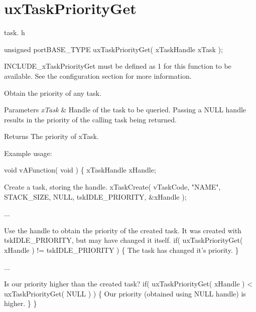 \hypertarget{group__ux_task_priority_get}{\section{ux\-Task\-Priority\-Get}
\label{group__ux_task_priority_get}
}
task. h 
\begin{DoxyPre}unsigned portBASE\_TYPE uxTaskPriorityGet( xTaskHandle xTask );\end{DoxyPre}


I\-N\-C\-L\-U\-D\-E\-\_\-x\-Task\-Priority\-Get must be defined as 1 for this function to be available. See the configuration section for more information.

Obtain the priority of any task.


\begin{DoxyParams}{Parameters}
{\em x\-Task} & Handle of the task to be queried. Passing a N\-U\-L\-L handle results in the priority of the calling task being returned.\\
\hline
\end{DoxyParams}
\begin{DoxyReturn}{Returns}
The priority of x\-Task.
\end{DoxyReturn}
Example usage\-: 
\begin{DoxyPre}
 void vAFunction( void )
 \{
 xTaskHandle xHandle;\end{DoxyPre}



\begin{DoxyPre}Create a task, storing the handle.
         xTaskCreate( vTaskCode, "NAME", STACK\_SIZE, NULL, tskIDLE\_PRIORITY, \&xHandle );\end{DoxyPre}



\begin{DoxyPre}...\end{DoxyPre}



\begin{DoxyPre}Use the handle to obtain the priority of the created task.
It was created with tskIDLE\_PRIORITY, but may have changed
it itself.
         if( uxTaskPriorityGet( xHandle ) != tskIDLE\_PRIORITY )
         \{
The task has changed it's priority.
         \}\end{DoxyPre}



\begin{DoxyPre}...\end{DoxyPre}



\begin{DoxyPre}Is our priority higher than the created task?
         if( uxTaskPriorityGet( xHandle ) < uxTaskPriorityGet( NULL ) )
         \{
Our priority (obtained using NULL handle) is higher.
         \}
 \}
   \end{DoxyPre}
 